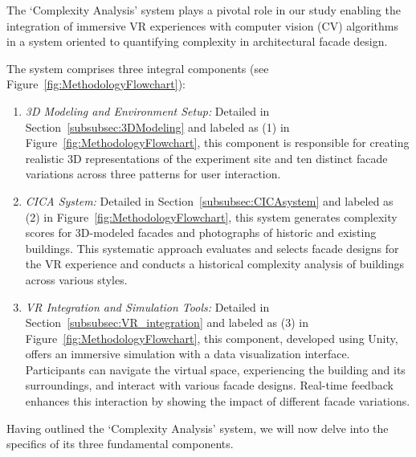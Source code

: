 The `Complexity Analysis' system plays a pivotal role in our study enabling the integration of immersive VR experiences with computer vision (CV) algorithms in a system oriented to quantifying complexity in architectural facade design.

The system comprises three integral components (see Figure~\ref{fig:MethodologyFlowchart}):

\begin{enumerate}
\item \textit{3D Modeling and Environment Setup:} Detailed in Section~\ref{subsubsec:3DModeling} and labeled as (1) in Figure~\ref{fig:MethodologyFlowchart}, this component is responsible for creating realistic 3D representations of the experiment site and ten distinct facade variations across three patterns for user interaction.

\item \textit{CICA System:} Detailed in Section~\ref{subsubsec:CICAsystem} and labeled as (2) in Figure~\ref{fig:MethodologyFlowchart}, this system generates complexity scores for 3D-modeled facades and photographs of historic and existing buildings.
This systematic approach evaluates and selects facade designs for the VR experience and conducts a historical complexity analysis of buildings across various styles.

\item \textit{VR Integration and Simulation Tools:} Detailed in Section~\ref{subsubsec:VR_integration} and labeled as (3) in Figure~\ref{fig:MethodologyFlowchart}, this component, developed using Unity, offers an immersive simulation with a data visualization interface.
Participants can navigate the virtual space, experiencing the building and its surroundings, and interact with various facade designs.
Real-time feedback enhances this interaction by showing the impact of different facade variations.
\end{enumerate}

Having outlined the `Complexity Analysis' system, we will now delve into the specifics of its three fundamental components.


